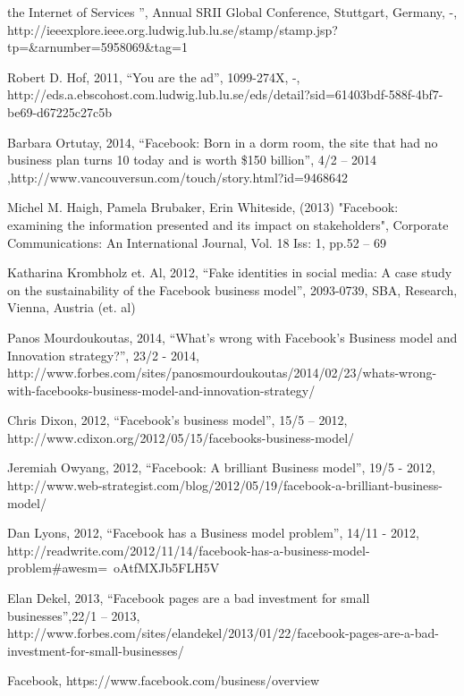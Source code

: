 \documentclass[conference]{IEEEtran}
\begin{document}
\begin{thebibliography}{1}
the Internet of Services ”, Annual SRII Global Conference, Stuttgart, Germany,
-,
http://ieeexplore.ieee.org.ludwig.lub.lu.se/stamp/stamp.jsp?tp=&arnumber=5958069&tag=1

Robert D. Hof, 2011, “You are the ad”, 1099-274X, -,
http://eds.a.ebscohost.com.ludwig.lub.lu.se/eds/detail?sid=61403bdf-588f-4bf7-be69-d67225c27c5b%

Barbara Ortutay, 2014, “Facebook: Born in a dorm room, the site that had no
business plan turns 10 today and is worth \$150 billion”, 4/2 – 2014
,http://www.vancouversun.com/touch/story.html?id=9468642

Michel M. Haigh, Pamela Brubaker, Erin Whiteside, (2013) "Facebook: examining
the information presented and its impact on stakeholders", Corporate
Communications: An International Journal, Vol. 18 Iss: 1, pp.52 – 69

Katharina Krombholz et. Al, 2012, “Fake identities in social media: A case
study on the sustainability of the Facebook business model”, 2093-0739, SBA,
Research, Vienna, Austria (et. al)

Panos Mourdoukoutas, 2014, “What's wrong with Facebook's Business model and
Innovation strategy?”, 23/2 - 2014,
http://www.forbes.com/sites/panosmourdoukoutas/2014/02/23/whats-wrong-with-facebooks-business-model-and-innovation-strategy/

Chris Dixon, 2012, “Facebook's business model”, 15/5 – 2012,
http://www.cdixon.org/2012/05/15/facebooks-business-model/

Jeremiah Owyang, 2012, “Facebook: A brilliant Business model”, 19/5 - 2012,
http://www.web-strategist.com/blog/2012/05/19/facebook-a-brilliant-business-model/

Dan Lyons, 2012, “Facebook has a Business model problem”, 14/11 - 2012,
http://readwrite.com/2012/11/14/facebook-has-a-business-model-problem#awesm=~oAtfMXJb5FLH5V

Elan Dekel, 2013, “Facebook pages are a bad investment for small
businesses”,22/1 – 2013,
http://www.forbes.com/sites/elandekel/2013/01/22/facebook-pages-are-a-bad-investment-for-small-businesses/

Facebook, https://www.facebook.com/business/overview


\end{thebibliography}
\end{document}
